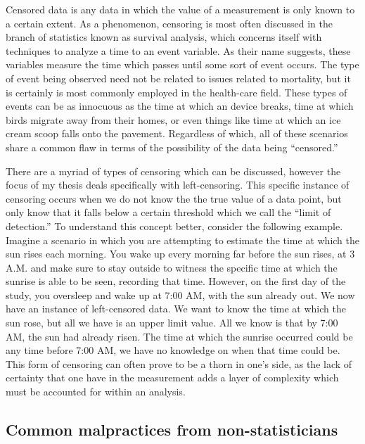 \documentclass[12pt, twoside]{amherstthesis}
\begin{document}
Censored data is any data in which the value of a measurement is only known to a certain extent. As a phenomenon, censoring is most often discussed in the branch of statistics known as survival analysis, which concerns itself with techniques to analyze a time to an event variable. As their name suggests, these variables measure the time which passes until some sort of event occurs. The type of event being observed need not be related to issues related to mortality, but it is certainly is most commonly employed in the health-care field. These types of events can be as innocuous as the time at which an device breaks, time at which birds migrate away from their homes, or even things like time at which an ice cream scoop falls onto the pavement. Regardless of which, all of these scenarios share a common flaw in terms of the possibility of the data being ``censored.''

There are a myriad of types of censoring which can be discussed, however the focus of my thesis deals specifically with left-censoring. This specific instance of censoring occurs when we do not know the the true value of a data point, but only know that it falls below a certain threshold which we call the ``limit of detection.'' To understand this concept better, consider the following example. Imagine a scenario in which you are attempting to estimate the time at which the sun rises each morning. You wake up every morning far before the sun rises, at 3 A.M. and make sure to stay outside to witness the specific time at which the sunrise is able to be seen, recording that time. However, on the first day of the study, you oversleep and wake up at 7:00 AM, with the sun already out. We now have an instance of left-censored data. We want to know the time at which the sun rose, but all we have is an upper limit value. All we know is that by 7:00 AM, the sun had already risen. The time at which the sunrise occurred could be any time before 7:00 AM, we have no knowledge on when that time could be. This form of censoring can often prove to be a thorn in one's side, as the lack of certainty that one have in the measurement adds a layer of complexity which must be accounted for within an analysis.

\hypertarget{common-malpractices-from-non-statisticians}{%
\subsection{Common malpractices from non-statisticians}\label{common-malpractices-from-non-statisticians}}
\end{document}
